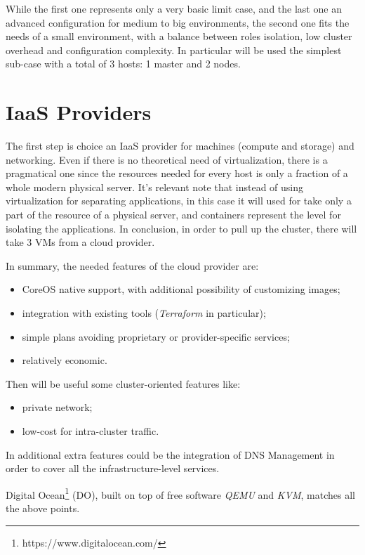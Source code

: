 While the first one represents only a very basic limit case, and the last one an advanced configuration for medium to big environments, the second one fits the needs of a small environment, with a balance between roles isolation, low cluster overhead and configuration complexity.  In particular will be used the simplest sub-case with a total of 3 hosts:  1 master and 2 nodes.

\section{IaaS Providers}\label{iaas-providers}

The first step is choice an IaaS provider for machines (compute and storage) and networking.  Even if there is no theoretical need of virtualization, there is a pragmatical one since the resources needed for every host is only a fraction of a whole modern physical server.  It's relevant note that instead of using virtualization for separating applications, in this case it will used for take only a part of the resource of a physical server, and containers represent the level for isolating the applications.  In conclusion, in order to pull up the cluster, there will take 3 VMs from a cloud provider.

In summary, the needed features of the cloud provider are:
\begin{itemize}
\item CoreOS native support, with additional possibility of customizing images;
\item integration with existing tools (\textit{Terraform} in particular);
\item simple plans avoiding proprietary or provider-specific services;
\item relatively economic.
\end{itemize}

Then will be useful some cluster-oriented features like:
\begin{itemize}
\item private network;
\item low-cost for intra-cluster traffic.
\end{itemize}

In additional extra features could be the integration of DNS Management in order to cover all the infrastructure-level services.

Digital Ocean\footnote{https://www.digitalocean.com/} (DO), built on top of free software \textit{QEMU} and \textit{KVM}, matches all the above points.

